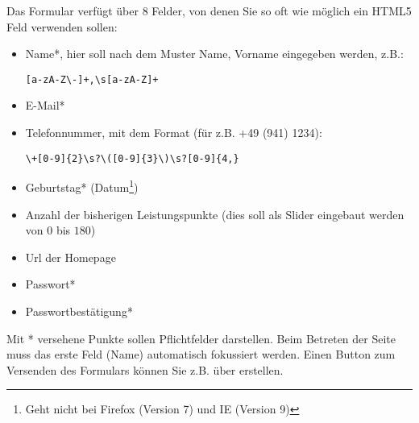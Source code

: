 %
\par Das Formular verfügt über 8 Felder, von denen Sie so oft wie möglich ein
HTML5 Feld verwenden sollen:
%
\begin{itemize}
\item
Name*, hier soll nach dem Muster Name, Vorname eingegeben werden, z.B.:
\begin{lstlisting}
[a-zA-Z\-]+,\s[a-zA-Z]+
\end{lstlisting}
\item
E-Mail*
\item
Telefonnummer, mit dem Format (für z.B. +49 (941) 1234):
\begin{lstlisting}
\+[0-9]{2}\s?\([0-9]{3}\)\s?[0-9]{4,}
\end{lstlisting}
\item
Geburtstag* (Datum\footnote{Geht nicht bei Firefox (Version 7) und IE
(Version 9)})
\item
Anzahl der bisherigen Leistungspunkte (dies soll als Slider eingebaut werden
von $0$ bis $180$)
\item
Url der Homepage
\item
Passwort*
\item
Passwortbestätigung*
\end{itemize}
%
\par Mit * versehene Punkte sollen Pflichtfelder darstellen. Beim Betreten der
Seite muss das erste Feld (Name) automatisch fokussiert werden. Einen Button
zum Versenden des Formulars können Sie z.B. über
 erstellen.